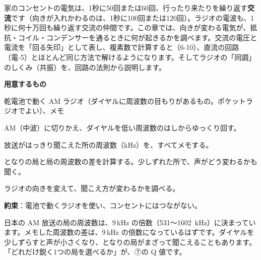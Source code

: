 \noindent 家のコンセントの電気は、1秒に50回または60回、行ったり来たりを繰り返す\textbf{交流}です（向きが入れかわるのは、1秒に100回または120回）。ラジオの電波も、1秒に何十万回も繰り返す交流の仲間です。この章では、向きが変わる電気が、抵抗・コイル・コンデンサーを通るときに何が起きるかを調べます。交流の電圧と電流を「回る矢印」として表し、複素数で計算すると（6-10）、直流の回路（電-5）とほとんど同じ方法で解けるようになります。そしてラジオの「同調」のしくみ（共振）を、回路の法則から説明します。

\begin{yattemiyou}
\textbf{用意するもの}\par
乾電池で動く AM ラジオ（ダイヤルに周波数の目もりがあるもの。ポケットラジオでよい）、メモ
\begin{enumerate}[label={\bkcircled[bkGreen]{\arabic*}}, leftmargin=2.4\zw, itemsep=1pt, topsep=2pt]
\item AM（中波）に切りかえ、ダイヤルを低い周波数のはしからゆっくり回す。
\item 放送がはっきり聞こえた所の周波数（kHz）を、すべてメモする。
\item となりの局と局の周波数の差を計算する。少しずれた所で、声がどう変わるかも聞く。
\item ラジオの向きを変えて、聞こえ方が変わるかを調べる。
\end{enumerate}
\textbf{約束}：電池で動くラジオを使い、コンセントにはつながない。
\end{yattemiyou}

\noindent 日本の AM 放送の局の周波数は、9\,kHz の倍数（531〜\qty{1602}{kHz}）に決まっています。メモした周波数の差は、9\,kHz の倍数になっているはずです。ダイヤルを少しずらすと声が小さくなり、となりの局がまざって聞こえることもあります。「どれだけ鋭く1つの局を選べるか」が、⑦の Q 値です。

\begin{omoidasou}
\end{omoidasou}

